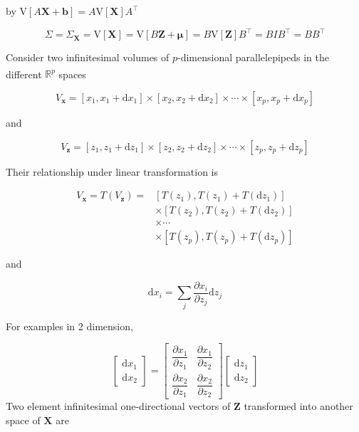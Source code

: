 \documentclass[
]{book}
\theoremstyle{definition}
\theoremstyle{definition}
\theoremstyle{definition}
\theoremstyle{definition}
\theoremstyle{remark}
\begin{document}
by \hyperref[mathrmvleftaboldsymbolxboldsymbolbrightamathrmvleftboldsymbolxrightamathrmt]{\(\mathrm{V}\left[A\boldsymbol{X}+\boldsymbol{b}\right]=A\mathrm{V}\left[\boldsymbol{X}\right]A^{\intercal}\)}

\begin{equation}
\label{eq:covlt}
\mathit{\Sigma}=\mathit{\Sigma}_{\boldsymbol{X}}=\mathrm{V}\left[\boldsymbol{X}\right]=\mathrm{V}\left[B\boldsymbol{Z}+\boldsymbol{\mu}\right]=B\mathrm{V}\left[\boldsymbol{Z}\right]B^{\intercal}=BIB^{\intercal}=BB^{\intercal}
\end{equation}

Consider two infinitesimal volumes of \(p\)-dimensional parallelepipeds in the different \(\mathbb{R}^p\) spaces\textsuperscript{}

\[
V_{\boldsymbol{x}}=\left[x_{1},x_{1}+\mathrm{d}x_{1}\right]\times\left[x_{2},x_{2}+\mathrm{d}x_{2}\right]\times\cdots\times\left[x_{p},x_{p}+\mathrm{d}x_{p}\right]
\]

and

\[
V_{\boldsymbol{z}}=\left[z_{1},z_{1}+\mathrm{d}z_{1}\right]\times\left[z_{2},z_{2}+\mathrm{d}z_{2}\right]\times\cdots\times\left[z_{p},z_{p}+\mathrm{d}z_{p}\right]
\]

Their relationship under linear transformation is

\[
\begin{aligned}
V_{\boldsymbol{x}}=T\left(V_{\boldsymbol{z}}\right)= & \left[T\left(z_{1}\right),T\left(z_{1}\right)+T\left(\mathrm{d}z_{1}\right)\right]\\
 & \times\left[T\left(z_{2}\right),T\left(z_{2}\right)+T\left(\mathrm{d}z_{2}\right)\right]\\
 & \times\cdots\\
 & \times\left[T\left(z_{p}\right),T\left(z_{p}\right)+T\left(\mathrm{d}z_{p}\right)\right]
\end{aligned}
\]

and

\[
\mathrm{d}x_{i}=\sum_{j}\dfrac{\partial x_{i}}{\partial z_{j}}\mathrm{d}z_{j}
\]

For examples in 2 dimension,

\[
\begin{bmatrix}\mathrm{d}x_{1}\\
\mathrm{d}x_{2}
\end{bmatrix}=\begin{bmatrix}\dfrac{\partial x_{1}}{\partial z_{1}} & \dfrac{\partial x_{1}}{\partial z_{2}}\\
\dfrac{\partial x_{2}}{\partial z_{1}} & \dfrac{\partial x_{2}}{\partial z_{2}}
\end{bmatrix}\begin{bmatrix}\mathrm{d}z_{1}\\
\mathrm{d}z_{2}
\end{bmatrix}
\]
Two element infinitesimal one-directional vectors of \(\boldsymbol{Z}\) transformed into another space of \(\boldsymbol{X}\) are
\end{document}
